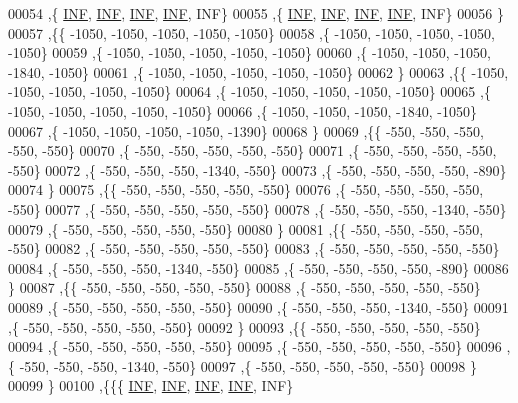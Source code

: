 \begin{DoxyCode}
00054   ,\{   \hyperlink{constants_8h_a12c2040f25d8e3a7b9e1c2024c618cb6}{INF},   \hyperlink{constants_8h_a12c2040f25d8e3a7b9e1c2024c618cb6}{INF},   \hyperlink{constants_8h_a12c2040f25d8e3a7b9e1c2024c618cb6}{INF},   \hyperlink{constants_8h_a12c2040f25d8e3a7b9e1c2024c618cb6}{INF},   INF\}
00055   ,\{   \hyperlink{constants_8h_a12c2040f25d8e3a7b9e1c2024c618cb6}{INF},   \hyperlink{constants_8h_a12c2040f25d8e3a7b9e1c2024c618cb6}{INF},   \hyperlink{constants_8h_a12c2040f25d8e3a7b9e1c2024c618cb6}{INF},   \hyperlink{constants_8h_a12c2040f25d8e3a7b9e1c2024c618cb6}{INF},   INF\}
00056   \}
00057  ,\{\{ -1050, -1050, -1050, -1050, -1050\}
00058   ,\{ -1050, -1050, -1050, -1050, -1050\}
00059   ,\{ -1050, -1050, -1050, -1050, -1050\}
00060   ,\{ -1050, -1050, -1050, -1840, -1050\}
00061   ,\{ -1050, -1050, -1050, -1050, -1050\}
00062   \}
00063  ,\{\{ -1050, -1050, -1050, -1050, -1050\}
00064   ,\{ -1050, -1050, -1050, -1050, -1050\}
00065   ,\{ -1050, -1050, -1050, -1050, -1050\}
00066   ,\{ -1050, -1050, -1050, -1840, -1050\}
00067   ,\{ -1050, -1050, -1050, -1050, -1390\}
00068   \}
00069  ,\{\{  -550,  -550,  -550,  -550,  -550\}
00070   ,\{  -550,  -550,  -550,  -550,  -550\}
00071   ,\{  -550,  -550,  -550,  -550,  -550\}
00072   ,\{  -550,  -550,  -550, -1340,  -550\}
00073   ,\{  -550,  -550,  -550,  -550,  -890\}
00074   \}
00075  ,\{\{  -550,  -550,  -550,  -550,  -550\}
00076   ,\{  -550,  -550,  -550,  -550,  -550\}
00077   ,\{  -550,  -550,  -550,  -550,  -550\}
00078   ,\{  -550,  -550,  -550, -1340,  -550\}
00079   ,\{  -550,  -550,  -550,  -550,  -550\}
00080   \}
00081  ,\{\{  -550,  -550,  -550,  -550,  -550\}
00082   ,\{  -550,  -550,  -550,  -550,  -550\}
00083   ,\{  -550,  -550,  -550,  -550,  -550\}
00084   ,\{  -550,  -550,  -550, -1340,  -550\}
00085   ,\{  -550,  -550,  -550,  -550,  -890\}
00086   \}
00087  ,\{\{  -550,  -550,  -550,  -550,  -550\}
00088   ,\{  -550,  -550,  -550,  -550,  -550\}
00089   ,\{  -550,  -550,  -550,  -550,  -550\}
00090   ,\{  -550,  -550,  -550, -1340,  -550\}
00091   ,\{  -550,  -550,  -550,  -550,  -550\}
00092   \}
00093  ,\{\{  -550,  -550,  -550,  -550,  -550\}
00094   ,\{  -550,  -550,  -550,  -550,  -550\}
00095   ,\{  -550,  -550,  -550,  -550,  -550\}
00096   ,\{  -550,  -550,  -550, -1340,  -550\}
00097   ,\{  -550,  -550,  -550,  -550,  -550\}
00098   \}
00099  \}
00100 ,\{\{\{   \hyperlink{constants_8h_a12c2040f25d8e3a7b9e1c2024c618cb6}{INF},   \hyperlink{constants_8h_a12c2040f25d8e3a7b9e1c2024c618cb6}{INF},   \hyperlink{constants_8h_a12c2040f25d8e3a7b9e1c2024c618cb6}{INF},   \hyperlink{constants_8h_a12c2040f25d8e3a7b9e1c2024c618cb6}{INF},   INF\}

\end{DoxyCode}
